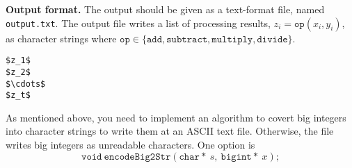 \documentclass{article}
\begin{document}
\bigskip
\noindent\textbf{Output format.} %
The output should be given as a text-format file, named \texttt{output.txt}.
The output file writes a list of  processing results, $z_i=\mathtt{op}(x_i,y_i)$, as character strings where $\mathtt{op}\in\{\mathtt{add},\mathtt{subtract},\mathtt{multiply},\mathtt{divide}\}$.


\begin{lstlisting}[backgroundcolor=\color{yellow!40}]
$z_1$
$z_2$
$\cdots$
$z_t$
\end{lstlisting}
As mentioned above, you need to implement an algorithm to covert big integers into character strings to write them at an ASCII text file.
Otherwise, the file writes big integers as unreadable characters. One option is 
\begin{equation*}
\mathtt{void}\ \mathtt{encodeBig2Str}(\mathtt{char*}\ s,\ \mathtt{bigint*}\ x);
\end{equation*}
%
%
%
\end{document}
